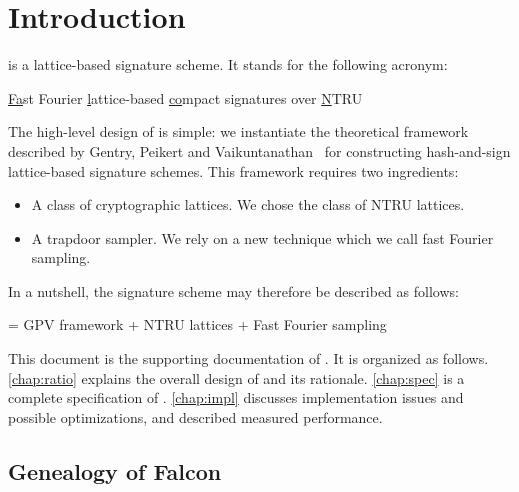 

\chapter{Introduction}

\falcon{} is a lattice-based signature scheme. It stands for the following acronym:
\begin{center}
\underline{Fa}st Fourier \underline{l}attice-based \underline{co}mpact signatures over \underline{N}TRU
\end{center}

The high-level design of \falcon is simple: we instantiate the theoretical framework described by Gentry, Peikert and Vaikuntanathan~\cite{STOC:GenPeiVai08} for constructing hash-and-sign lattice-based signature schemes. This framework requires two ingredients:
\begin{itemize}
 \item A class of cryptographic lattices. We chose the class of NTRU lattices.
 \item A trapdoor sampler. We rely on a new technique which we call fast Fourier sampling.
\end{itemize}
In a nutshell, the \falcon signature scheme may therefore be described as follows:
\begin{center}
\falcon = GPV framework + NTRU lattices + Fast Fourier sampling
\end{center}

This document is the supporting documentation of \falcon. It is organized as follows. \cref{chap:ratio} explains the overall design of \falcon and its rationale. \cref{chap:spec} is a complete specification of \falcon. \cref{chap:impl} discusses implementation issues and possible optimizations, and described measured performance.

\newpage

\section{Genealogy of Falcon}

